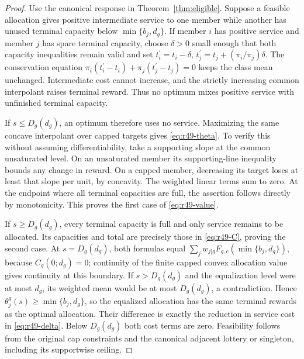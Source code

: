 \begin{proof}
Use the canonical response in Theorem~\ref{thm:eligible}. Suppose a feasible allocation gives positive intermediate service to one member while another has unused terminal capacity below $\min\{b_j,d_g\}$. If member $i$ has positive service and member $j$ has spare terminal capacity, choose $\delta>0$ small enough that both capacity inequalities remain valid and set $t_i^{\prime}=t_i-\delta$, $t_j^{\prime}=t_j+(\pi_i/\pi_j)\delta$. The conservation equation $\pi_i(t_i^{\prime}-t_i)+\pi_j(t_j^{\prime}-t_j)=0$ keeps the class mean unchanged. Intermediate cost cannot increase, and the strictly increasing common interpolant raises terminal reward. Thus no optimum mixes positive service with unfinished terminal capacity.

If $s\leq D_g(d_g)$, an optimum therefore uses no service. Maximizing the same concave interpolant over capped targets gives \eqref{eq:r49-theta}. To verify this without assuming differentiability, take a supporting slope at the common unsaturated level. On an unsaturated member its supporting-line inequality bounds any change in reward. On a capped member, decreasing its target loses at least that slope per unit, by concavity. The weighted linear terms sum to zero. At the endpoint where all terminal capacities are full, the assertion follows directly by monotonicity. This proves the first case of \eqref{eq:r49-value}.

If $s\geq D_g(d_g)$, every terminal capacity is full and only service remains to be allocated. Its capacities and total are precisely those in \eqref{eq:r49-C}, proving the second case. At $s=D_g(d_g)$, both formulas equal $\sum_jw_{j|g}F_{g,c}(\min\{b_j,d_g\})$, because $C_g(0;d_g)=0$; continuity of the finite capped convex allocation value gives continuity at this boundary. If $s>D_g(d_g)$ and the equalization level were at most $d_g$, its weighted mean would be at most $D_g(d_g)$, a contradiction. Hence $\theta_j^g(s)\geq\min\{b_j,d_g\}$, so the equalized allocation has the same terminal rewards as the optimal allocation. Their difference is exactly the reduction in service cost in \eqref{eq:r49-delta}. Below $D_g(d_g)$ both cost terms are zero. Feasibility follows from the original cap constraints and the canonical adjacent lottery or singleton, including its supportwise ceiling.\end{proof}

